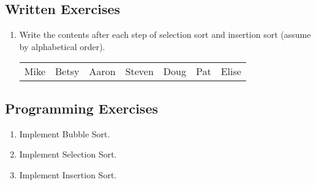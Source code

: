 \subsection{Written Exercises}

\setcounter{counter}{1}
\begin{enumerate}[label={\arabic{counter}\addtocounter{counter}{1}}.]

\item Write the contents after each step of selection sort and insertion sort (assume by alphabetical order).
\begin{table}[h]
\begin{tabular}{lllllll}
Mike & Betsy & Aaron & Steven & Doug & Pat & Elise
\end{tabular}
\end{table}

\end{enumerate}

\subsection{Programming Exercises}

\setcounter{counter}{1}
\begin{enumerate}[label={\arabic{counter}\addtocounter{counter}{1}}.]

\item Implement Bubble Sort.
\item Implement Selection Sort.
\item Implement Insertion Sort.

\end{enumerate}